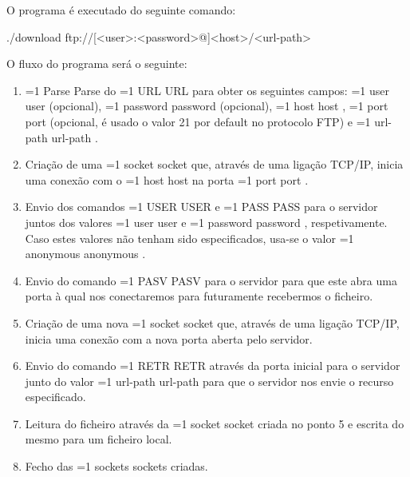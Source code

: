 \documentclass[11pt,a4paper,twocolumn]{article}
\newcommand{\hl}[2][1]{%
  \ifnum#1=1\relax
    \textcolor{text-hl1}{#2}%
  \else
    \textcolor{text-hl2}{#2}%
  \fi
}
\begin{document}
O programa é executado do seguinte comando:

\begin{bash-darktheme}
./download ftp://[<user>:<password>@]<host>/<url-path>
\end{bash-darktheme}

O fluxo do programa será o seguinte:

\begin{enumerate}
    \item \hl{Parse} do \hl{URL} para obter os seguintes campos: \hl[2]{user} (opcional), \hl[2]{password} (opcional), \hl[2]{host}, \hl[2]{port} (opcional, é usado o valor 21 por default no protocolo FTP) e \hl[2]{url-path}.
    \item Criação de uma \hl{socket} que, através de uma ligação TCP/IP, inicia uma conexão com o \hl[2]{host} na porta \hl[2]{port}.
    \item Envio dos comandos \hl{USER} e \hl{PASS} para o servidor juntos dos valores \hl[2]{user} e \hl[2]{password}, respetivamente. Caso estes valores não tenham sido especificados, usa-se o valor \hl{anonymous}.
    \item Envio do comando \hl{PASV} para o servidor para que este abra uma porta à qual nos conectaremos para futuramente recebermos o ficheiro.
    \item Criação de uma nova \hl{socket} que, através de uma ligação TCP/IP, inicia uma conexão com a nova porta aberta pelo servidor.
    \item Envio do comando \hl{RETR} através da porta inicial para o servidor junto do valor \hl[2]{url-path} para que o servidor nos envie o recurso especificado.
    \item Leitura do ficheiro através da \hl{socket} criada no ponto 5 e escrita do mesmo para um ficheiro local.
    \item Fecho das \hl{sockets} criadas.
\end{enumerate}
\end{document}
